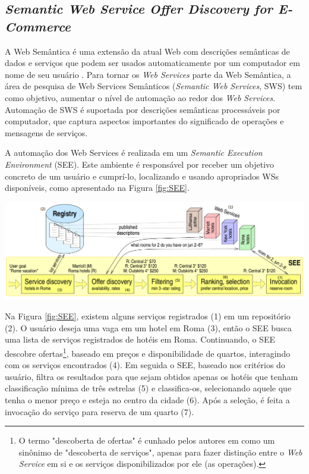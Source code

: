 \subsection{\textit{Semantic Web Service Offer Discovery for E-Commerce} \cite{kopecky2008semantic}} \label{sec:sws-offer}

A Web Semântica é uma extensão da atual Web com descrições semânticas de dados e serviços que podem ser usados automaticamente por um computador em nome de seu usuário \cite{kopecky2008semantic}. Para tornar os \textit{Web Services} parte da Web Semântica, a área de pesquisa de Web Services Semânticos (\textit{Semantic Web Services}, SWS) tem como objetivo, aumentar o nível de automação ao redor dos \textit{Web Services}. Automação de SWS é suportada por descrições semânticas processáveis por computador, que captura aspectos importantes do significado de operações e mensagens de serviços. \cite{kopecky2008semantic}

A automação dos Web Services é realizada em um \textit{Semantic Execution Environment} (SEE). Este ambiente é responsável por receber um objetivo concreto de um usuário e cumprí-lo, localizando e usando apropriados WSs disponíveis, como apresentado na Figura \ref{fig:SEE}.

\begin{center}
	\includegraphics[width=1\textwidth]{images/see.png}
	\label{fig:SEE}
\end{center}

Na Figura \ref{fig:SEE}, existem alguns serviços registrados (1) em um repositório (2). O usuário deseja uma vaga em um hotel em Roma (3), então o SEE busca uma lista de serviços registrados de hotéis em Roma. Continuando, o SEE descobre ofertas\footnote{O termo "descoberta de ofertas" é cunhado pelos autores em \cite{kopecky2008semantic} como um sinônimo de "descoberta de serviços", apenas para fazer distinção entre o \textit{Web Service} em si e os serviços disponibilizados por ele (as operações).}, baseado em preços e disponibilidade de quartos, interagindo com os serviços encontrados (4). Em seguida o SEE, baseado nos critérios do usuário, filtra os resultados para que sejam obtidos apenas os hotéis que tenham classificação mínima de três estrelas (5) e classifica-os, selecionando aquele que tenha o menor preço e esteja no centro da cidade (6). Após a seleção, é feita a invocação do serviço para reserva de um quarto (7).

